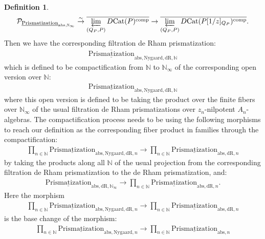 \documentclass[12pt]{article}
\theoremstyle{definition}
\newtheorem{definition}{Definition}
\begin{document}
\begin{definition}
\begin{align}
\mathcal{P}_{\underline{\mathrm{Prismatization}}_{\mathrm{abs},\mathbb{N}_\infty}} \overset{\sim}{\rightarrow} \overline{\varprojlim_{(Q_P,P)} D\mathrm{Cat}(P)^\mathrm{comp}}\rightarrow \overline{\varprojlim_{(Q_P,P)} D\mathrm{Cat}(P[1/z]_{Q_P})^\mathrm{comp}}.
\end{align}
Then we have the corresponding filtration de Rham  prismatization:
\begin{align}
\overline{\underline{\mathrm{Prismatization}}}_{\mathrm{abs},\mathrm{Nygaard},\mathrm{dR},\mathbb{N}}
\end{align}
which is defined to be compactification from $\mathbb{N}$ to $\mathbb{N}_\infty$ of the corresponding open version over $\mathbb{N}$:
\begin{align}
{\underline{\mathrm{Prismatization}}}_{\mathrm{abs},\mathrm{Nygaard},\mathrm{dR},\mathbb{N}}
\end{align}
where this open version is defined to be taking the product over the finite fibers over $\mathbb{N}_\infty$ of the usual filtration de Rham  prismatizations over $z_n$-nilpotent $A_n$-algebras. The compactification process needs to be using the following morphisms to reach our definition as the corresponding fiber product in families through the compactification:
\begin{align}
\prod_{n\in \mathbb{N}} {\underline{\mathrm{Prismatization}}}_{\mathrm{abs},\mathrm{Nygaard},\mathrm{dR},n}\rightarrow  \prod_{n\in \mathbb{N}} {\underline{\mathrm{Prismatization}}}_{\mathrm{abs},\mathrm{dR},n}
\end{align}
by taking the products along all $\mathbb{N}$ of the usual projection from the corresponding filtration de Rham prismatization to the de Rham prismatization, and:
\begin{align}
{\underline{\mathrm{Prismatization}}}_{\mathrm{abs},\mathrm{dR},\mathbb{N}_\infty}\rightarrow  \prod_{n\in \mathbb{N}} {\underline{\mathrm{Prismatization}}}_{\mathrm{abs},\mathrm{dR},n}.
\end{align}
Here the morphism
\begin{align}
\prod_{n\in \mathbb{N}} {\underline{\mathrm{Prismatization}}}_{\mathrm{abs},\mathrm{Nygaard},\mathrm{dR},n}\rightarrow  \prod_{n\in \mathbb{N}} {\underline{\mathrm{Prismatization}}}_{\mathrm{abs},\mathrm{dR},n}
\end{align}
is the base change of the morphism:
\begin{align}
\prod_{n\in \mathbb{N}} {\underline{\mathrm{Prismatization}}}_{\mathrm{abs},\mathrm{Nygaard},n}\rightarrow  \prod_{n\in \mathbb{N}} {\underline{\mathrm{Prismatization}}}_{\mathrm{abs},n}

\end{align}
\end{definition}
\end{document}
